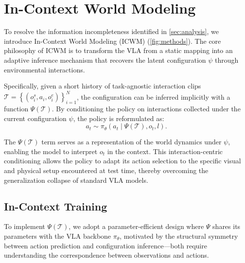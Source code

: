 \documentclass{llmxive}
\begin{document}
\section{In-Context World Modeling}
\label{sec:method}

To resolve the information incompleteness identified in \autoref{sec:analysis}, we introduce In-Context World Modeling (ICWM) (\autoref{fig:methods}). The core philosophy of ICWM is to transform the VLA from a static mapping into an adaptive inference mechanism that recovers the latent configuration $\psi$ through environmental interactions. 

Specifically, given a short history of task-agnostic interaction clips $\mathcal{T} = \left\{\left(o^s_i, a_i, o^e_i\right) \right\}_{i=1}^{N}$, the configuration can be inferred implicitly with a function $\Psi\left(\mathcal{T}\right)$. By conditioning the policy on interactions collected under the current configuration $\psi$, the policy is reformulated as:
\begin{equation}
a_t \sim \pi_\theta\left(a_t \mid \Psi \left(\mathcal{T}\right), o_t, l\right).
\end{equation}

The $\Psi\left(\mathcal{T}\right)$ term serves as a representation of the world dynamics under $\psi$, enabling the model to interpret $o_t$ in the context. This interaction-centric conditioning allows the policy to adapt its action selection to the specific visual and physical setup encountered at test time, thereby overcoming the generalization collapse of standard VLA models.


\subsection{In-Context Training}
\label{subsec:training}

To implement $\Psi\left(\mathcal{T}\right)$, we adopt a parameter-efficient design where $\Psi$ 
shares its parameters with the VLA backbone $\pi_\theta$, motivated by the structural symmetry between action prediction and configuration inference—both require understanding the correspondence between observations and actions. 
\end{document}
